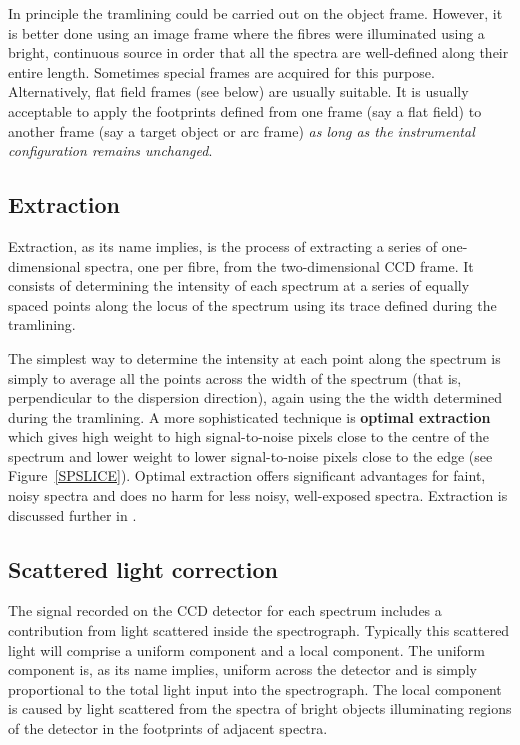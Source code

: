 \documentclass[chapters,twoside,11pt]{starlink}
\begin{document}
In principle the tramlining could be carried out on the object
frame.  However, it is better done using an image frame where the
fibres were illuminated using a bright, continuous source in order that
all the spectra are well-defined along their entire length.  Sometimes
special frames are acquired for this purpose.  Alternatively, flat
field frames (see below) are usually suitable.  It is usually
acceptable to apply the footprints defined from one frame (say a flat
field) to another frame (say a target object or arc frame) \textit{as long
as the instrumental configuration remains unchanged}.

\subsection{Extraction}

Extraction, as its name implies, is the process of extracting a series
of one-dimensional spectra, one per fibre, from the two-dimensional
CCD frame.  It consists of determining the intensity of each spectrum
at a series of equally spaced points along the locus of the spectrum
using its trace defined during the tramlining.

The simplest way to determine the intensity at each point along the
spectrum is simply to average all the points across the width of
the spectrum (that is, perpendicular to the dispersion direction),
again using the the width determined during the tramlining.  A more
sophisticated technique is \textbf{optimal extraction} which gives high
weight to high signal-to-noise pixels close to the centre of the
spectrum and lower weight to lower signal-to-noise pixels close to the
edge (see Figure~\ref{SPSLICE}).  Optimal extraction offers significant
advantages for faint, noisy spectra and does no harm for less noisy,
well-exposed spectra.  Extraction is discussed further in
.

\subsection{\label{SCATTER}Scattered light correction}

The signal recorded on the CCD detector for each spectrum includes a
contribution from light scattered inside the spectrograph.  Typically
this scattered light will comprise a uniform component and a local
component.  The uniform component is, as its name implies, uniform across
the detector and is simply proportional to the total light input into the
spectrograph.  The local component is caused by light scattered from
the spectra of bright objects illuminating regions of the detector
in the footprints of adjacent spectra.
\end{document}
